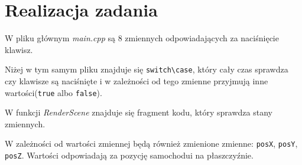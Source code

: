 \documentclass[a4paper, 12pt]{report}
\begin{document}
\section{Realizacja zadania}

W pliku głównym \emph{main.cpp} są 8 zmiennych odpowiadających za naciśnięcie klawisz.



Niżej w tym samym pliku znajduje się \verb|switch\case|, który cały czas sprawdza czy klawisze są naciśnięte i w zależności od tego zmienne przyjmują inne wartości(\verb|true| albo \verb|false|).



W funkcji \emph{RenderScene} znajduje się fragment kodu, który sprawdza stany zmiennych.



W zależności od wartości zmiennej będą również zmienione zmienne: \verb|posX|, \verb|posY|, \verb|posZ|. Wartości odpowiadają za pozycję samochodui na płaszczyźnie. 
\end{document}
